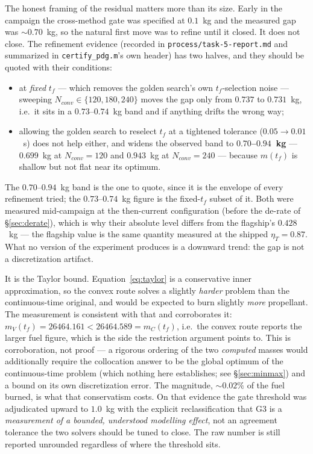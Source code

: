 \documentclass[11pt]{article}
\newcommand{\etaT}{\eta_T}
\begin{document}
The honest framing of the residual matters more than its size.
Early in the campaign the cross-method gate was specified at $0.1$~kg and
the measured gap was $\sim 0.70$~kg, so the natural first move was to
refine until it closed. It does not close. The refinement evidence
(recorded in \texttt{process/task-5-report.md} and summarized in
\texttt{certify\_pdg.m}'s own header) has two halves, and they should be
quoted with their conditions:
%
\begin{itemize}
\item at \emph{fixed} $t_f$ --- which removes the golden search's own
$t_f$-selection noise --- sweeping $N_{conv} \in \{120, 180, 240\}$ moves
the gap only from $0.737$ to $0.731$~kg, i.e.\ it sits in a
$0.73$--$0.74$~kg band and if anything drifts the wrong way;
\item allowing the golden search to reselect $t_f$ at a tightened
tolerance ($0.05 \to 0.01$~s) does not help either, and widens the observed
band to \textbf{$0.70$--$0.94$~kg} --- $0.699$~kg at $N_{conv}=120$ and
$0.943$~kg at $N_{conv}=240$ --- because $m(t_f)$ is shallow but not flat
near its optimum.
\end{itemize}
%
The $0.70$--$0.94$~kg band is the one to quote, since it is the envelope of
every refinement tried; the $0.73$--$0.74$~kg figure is the fixed-$t_f$
subset of it. Both were measured mid-campaign at the then-current
configuration (before the de-rate of \S\ref{sec:derate}), which is why
their absolute level differs from the flagship's $0.428$~kg --- the
flagship value is the same quantity measured at the shipped
$\etaT = 0.87$. What no version of the experiment produces is a downward
trend: the gap is not a discretization artifact.

It is the Taylor bound. Equation~\eqref{eq:taylor} is a conservative inner
approximation, so the convex route solves a slightly \emph{harder} problem
than the continuous-time original, and would be expected to burn slightly
\emph{more} propellant. The measurement is consistent with that and
corroborates it: $m_V(t_f) = 26464.161 < 26464.589 = m_C(t_f)$, i.e.\ the
convex route reports the larger fuel figure, which is the side the
restriction argument points to. This is corroboration, not proof --- a
rigorous ordering of the two \emph{computed} masses would additionally
require the collocation answer to be the global optimum of the
continuous-time problem (which nothing here establishes; see
\S\ref{sec:minmax}) and a bound on its own discretization error. The
magnitude, $\sim 0.02\%$ of the fuel burned, is
what that conservatism costs. On that evidence the gate threshold was
adjudicated upward to $1.0$~kg with the explicit reclassification that G3
is a \emph{measurement of a bounded, understood modelling effect}, not an
agreement tolerance the two solvers should be tuned to close. The raw
number is still reported unrounded regardless of where the threshold sits.
\end{document}

